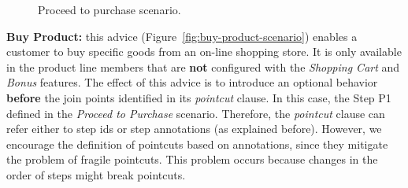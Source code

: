 \begin{figure}[h]
\caption{Proceed to purchase scenario.}
\label{fig:proceed-to-checkout}
\end{figure}

{\bf Buy Product:} this advice (Figure~\ref{fig:buy-product-scenario}) enables a
customer to buy specific goods from an on-line shopping store. It is only
available in the product line members that are {\bf not} configured with the
\emph{Shopping Cart} and \emph{Bonus} features. The effect of this advice is to
introduce an optional behavior {\bf before} the join points identified in its
\emph{pointcut} clause. In this case, the Step P1 defined in the \emph{Proceed to
Purchase} scenario. Therefore, the \emph{pointcut} clause can refer either to step ids or
step annotations (as explained before). However, we encourage the definition of
pointcuts based on annotations, since they mitigate the problem
of fragile pointcuts. This problem occurs because changes in the order of
steps might break pointcuts.
 
